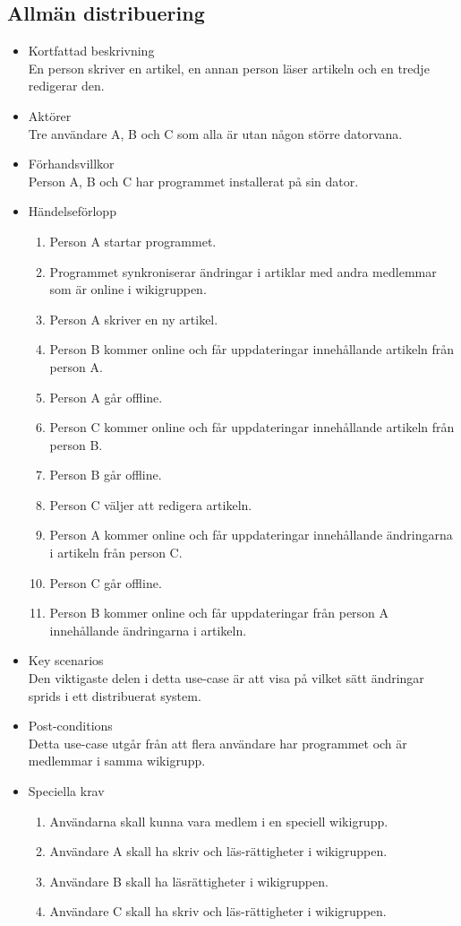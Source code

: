 \subsection{Allmän distribuering}
\begin{itemize}
	\item Kortfattad beskrivning
	\\En person skriver en artikel, en annan person läser artikeln och en tredje redigerar den.
	\item Aktörer
	\\Tre användare A, B och C som alla är utan någon större datorvana.
	\item Förhandsvillkor
	\\Person A, B och C har programmet installerat på sin dator.
	\pagebreak 	
	\item Händelseförlopp
	\begin{enumerate}
		\item Person A startar programmet.
		\item Programmet synkroniserar ändringar i artiklar med andra medlemmar som är online i wikigruppen.
		\item Person A skriver en ny artikel.
		\item Person B kommer online och får uppdateringar innehållande artikeln från person A.
		\item Person A går offline.
		\item Person C kommer online och får uppdateringar innehållande artikeln från person B.
		\item Person B går offline.
		\item Person C väljer att redigera artikeln.
		\item Person A kommer online och får uppdateringar innehållande ändringarna i artikeln från person C.
		\item Person C går offline.
		\item Person B kommer online och får uppdateringar från person A innehållande ändringarna i artikeln.
	\end{enumerate}	
	\item Key scenarios
	\\Den viktigaste delen i detta use-case är att visa på vilket sätt ändringar sprids i ett distribuerat system.
	\item Post-conditions
	\\Detta use-case utgår från att flera användare har programmet och är medlemmar i samma wikigrupp.
	\item Speciella krav
	\begin{enumerate}	
		\item Användarna skall kunna vara medlem i en speciell wikigrupp.
		\item Användare A skall ha skriv och läs-rättigheter i wikigruppen.
		\item Användare B skall ha läsrättigheter i wikigruppen.
		\item Användare C skall ha skriv och läs-rättigheter i wikigruppen.
	\end{enumerate}
\end{itemize}


